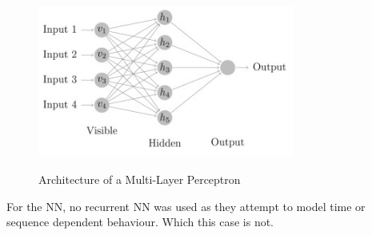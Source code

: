 \vspace{10 pt}

\begin{figure}[!htb]
\centering
\includegraphics[width=0.75\textwidth]{images/MLP.png}
\caption{Architecture of a Multi-Layer Perceptron}
\label{fig:MLP}
\parencite{MLP}
\end{figure}

\vspace{10 pt}


For the NN, no recurrent NN was used as they attempt to model time or sequence dependent behaviour. Which this case is not.  